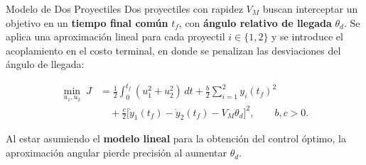 \begin{block}{Modelo de Dos Proyectiles}
	Dos proyectiles con rapidez $V_M$ buscan interceptar un objetivo en un
	\textbf{tiempo final común} $t_f$, con \textbf{ángulo relativo de llegada} $\theta_d$.
	Se aplica una aproximación lineal para cada proyectil $i\in\{1,2\}$ y se introduce
	el acoplamiento en el costo terminal, en donde se penalizan las desviaciones del ángulo de llegada:

	\vspace{-0.9cm}
	$$
	\begin{aligned}
	\min_{u_1,u_2}\;J&=\frac12\int_0^{t_f}(u_1^2+u_2^2)\,dt
	+\frac b2\sum_{i=1}^2 y_i(t_f)^2\\
	&\quad+\frac c2\big[\dot y_1(t_f)-\dot y_2(t_f)-V_M\theta_d\big]^2,
	\qquad b,c>0.
	\end{aligned}
	$$

	Al estar asumiendo el \textbf{modelo lineal} para la obtención del control óptimo, la aproximación angular pierde precisión al aumentar $\theta_d$.

	{\def\marginimagetop{-1}
	}

\end{block}

